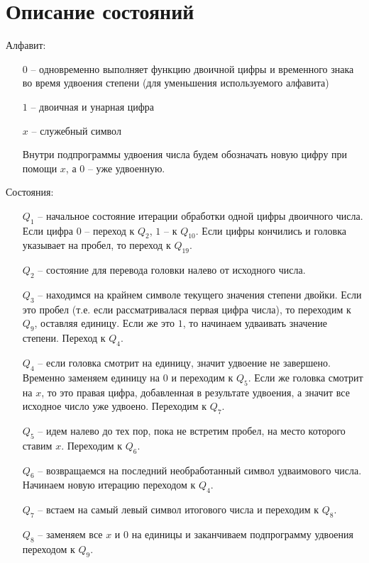     \section{Описание состояний}
    Алфавит:
    \begin{itemize}
        \item[$0$] -- одновременно выполняет функцию двоичной цифры и временного знака во время удвоения степени (для уменьшения используемого алфавита)
        \item[$1$] -- двоичная и унарная цифра
        \item[$x$] -- служебный символ
        \item[] Внутри подпрограммы удвоения числа будем обозначать новую цифру при помощи $x$, а $0$ -- уже удвоенную.
    \end{itemize}
    Состояния:
    \begin{itemize}
        \item[$Q_1$] -- начальное состояние итерации обработки одной цифры двоичного числа.
        Если цифра $0$ -- переход к $Q_2$, $1$ -- к $Q_{10}$.
        Если цифры кончились и головка указывает на пробел, то переход к $Q_{19}$.
        \item[$Q_2$] -- состояние для перевода головки налево от исходного числа.
        \item[$Q_3$] -- находимся на крайнем символе текущего значения степени двойки.
        Если это пробел (т.е. если рассматривалася первая цифра числа), то переходим к $Q_9$, оставляя единицу.
        Если же это $1$, то начинаем удваивать значение степени.
        Переход к $Q_4$.
        \item[$Q_4$] -- если головка смотрит на единицу, значит удвоение не завершено.
        Временно заменяем единицу на $0$ и переходим к $Q_5$.
        Если же головка смотрит на $x$, то это правая цифра, добавленная в результате удвоения, а значит все исходное число уже удвоено.
        Переходим к $Q_7$.
        \item[$Q_5$] -- идем налево до тех пор, пока не встретим пробел, на место которого ставим $x$.
        Переходим к $Q_6$.
        \item[$Q_6$] -- возвращаемся на последний необработанный символ удваимового числа.
        Начинаем новую итерацию переходом к $Q_4$.
        \item[$Q_7$] -- встаем на самый левый символ итогового числа и переходим к $Q_8$.
        \item[$Q_8$] -- заменяем все $x$ и $0$ на единицы и заканчиваем подпрограмму удвоения переходом к $Q_9$.

\end{itemize}

